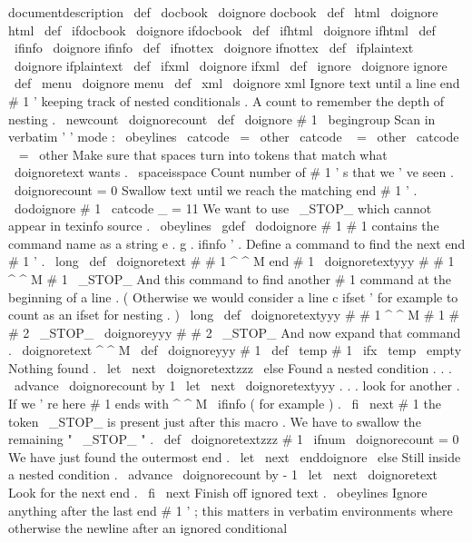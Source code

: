 {{{{{
documentdescription
}
}
\
def
\
docbook
{
\
doignore
{
docbook
}
}
\
def
\
html
{
\
doignore
{
html
}
}
\
def
\
ifdocbook
{
\
doignore
{
ifdocbook
}
}
\
def
\
ifhtml
{
\
doignore
{
ifhtml
}
}
\
def
\
ifinfo
{
\
doignore
{
ifinfo
}
}
\
def
\
ifnottex
{
\
doignore
{
ifnottex
}
}
\
def
\
ifplaintext
{
\
doignore
{
ifplaintext
}
}
\
def
\
ifxml
{
\
doignore
{
ifxml
}
}
\
def
\
ignore
{
\
doignore
{
ignore
}
}
\
def
\
menu
{
\
doignore
{
menu
}
}
\
def
\
xml
{
\
doignore
{
xml
}
}
%
Ignore
text
until
a
line
end
#
1
'
keeping
track
of
nested
conditionals
.
%
%
A
count
to
remember
the
depth
of
nesting
.
\
newcount
\
doignorecount
\
def
\
doignore
#
1
{
\
begingroup
%
Scan
in
verbatim
'
'
mode
:
\
obeylines
\
catcode
\
=
\
other
\
catcode
\
{
=
\
other
\
catcode
\
}
=
\
other
%
%
Make
sure
that
spaces
turn
into
tokens
that
match
what
\
doignoretext
wants
.
\
spaceisspace
%
%
Count
number
of
#
1
'
s
that
we
'
ve
seen
.
\
doignorecount
=
0
%
%
Swallow
text
until
we
reach
the
matching
end
#
1
'
.
\
dodoignore
{
#
1
}
%
}
{
\
catcode
_
=
11
%
We
want
to
use
\
_STOP_
which
cannot
appear
in
texinfo
source
.
\
obeylines
%
%
\
gdef
\
dodoignore
#
1
{
%
%
#
1
contains
the
command
name
as
a
string
e
.
g
.
ifinfo
'
.
%
%
Define
a
command
to
find
the
next
end
#
1
'
.
\
long
\
def
\
doignoretext
#
#
1
^
^
M
end
#
1
{
%
\
doignoretextyyy
#
#
1
^
^
M
#
1
\
_STOP_
}
%
%
%
And
this
command
to
find
another
#
1
command
at
the
beginning
of
a
%
line
.
(
Otherwise
we
would
consider
a
line
c
ifset
'
for
%
example
to
count
as
an
ifset
for
nesting
.
)
\
long
\
def
\
doignoretextyyy
#
#
1
^
^
M
#
1
#
#
2
\
_STOP_
{
\
doignoreyyy
{
#
#
2
}
\
_STOP_
}
%
%
%
And
now
expand
that
command
.
\
doignoretext
^
^
M
%
}
%
}
\
def
\
doignoreyyy
#
1
{
%
\
def
\
temp
{
#
1
}
%
\
ifx
\
temp
\
empty
%
Nothing
found
.
\
let
\
next
\
doignoretextzzz
\
else
%
Found
a
nested
condition
.
.
.
\
advance
\
doignorecount
by
1
\
let
\
next
\
doignoretextyyy
%
.
.
.
look
for
another
.
%
If
we
'
re
here
#
1
ends
with
^
^
M
\
ifinfo
(
for
example
)
.
\
fi
\
next
#
1
%
the
token
\
_STOP_
is
present
just
after
this
macro
.
}
%
We
have
to
swallow
the
remaining
"
\
_STOP_
"
.
%
\
def
\
doignoretextzzz
#
1
{
%
\
ifnum
\
doignorecount
=
0
%
We
have
just
found
the
outermost
end
.
\
let
\
next
\
enddoignore
\
else
%
Still
inside
a
nested
condition
.
\
advance
\
doignorecount
by
-
1
\
let
\
next
\
doignoretext
%
Look
for
the
next
end
.
\
fi
\
next
}
%
Finish
off
ignored
text
.
{
\
obeylines
%
%
Ignore
anything
after
the
last
end
#
1
'
;
this
matters
in
verbatim
%
environments
where
otherwise
the
newline
after
an
ignored
conditional
}}}}
